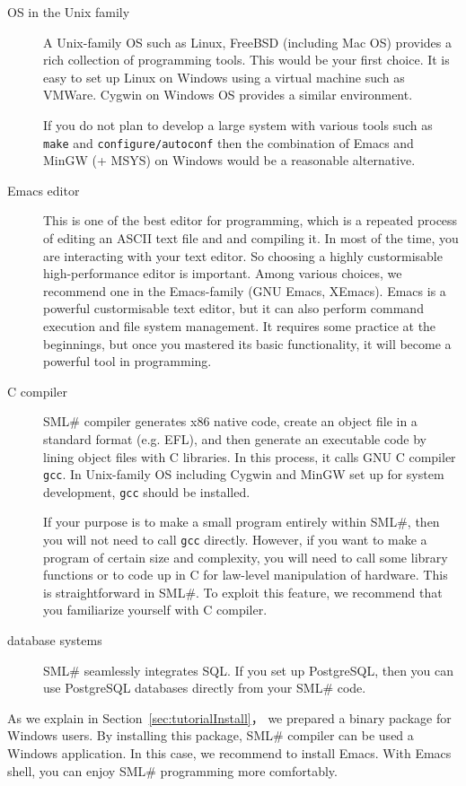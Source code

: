 \documentclass{jbook}
\newcommand{\smlsharp}{SML\#}
\begin{document}
\begin{description}
\item[OS in the Unix family] 
	A Unix-family OS such as Linux, FreeBSD (including Mac OS)
provides a rich collection of programming tools.
	This would be your first choice.
	It is easy to set up Linux on Windows using a virtual machine
such as VMWare.
	Cygwin on Windows OS provides a similar environment.

	If you do not plan to develop a large system with various tools
such as {\tt make} and {\tt configure/autoconf} then
the combination of Emacs and MinGW (+ MSYS) on Windows would be a
reasonable alternative.
	
\item[Emacs editor]
	This is one of the best editor for programming, which is a
repeated process of editing an ASCII text file and and compiling it.
	In most of the time, you are interacting with your text editor.
	So choosing a highly custormisable high-performance editor is
important.
	Among various choices, we recommend one in the Emacs-family (GNU
Emacs, XEmacs).
	Emacs is a powerful custormisable text editor, but it can also 
perform command execution and file system management. 
	It requires some practice at the beginnings, but once you mastered
its basic functionality, it will become a powerful tool in programming.

\item[C compiler] 
	\smlsharp{} compiler generates x86 native code, create an
object file in a standard format (e.g. EFL), and then generate 
an executable code by lining object files with C libraries.
	In this process, it calls GNU C compiler {\tt gcc}.
	In Unix-family OS including Cygwin and MinGW set up for
system development, {\tt gcc} should be installed.

	If your purpose is to make a small program entirely within
\smlsharp{}, then you will not need to call {\tt gcc} directly.
	However, if you want to make a program of certain size and
complexity, you will need to call some library functions or to code up
in C for law-level manipulation of hardware.
	This is straightforward in \smlsharp{}.
	To exploit this feature, we recommend that you familiarize
yourself with C compiler.	
\item[database systems] 
	\smlsharp{} seamlessly integrates SQL.
	If you set up PostgreSQL, then you can use PostgreSQL databases
directly from your \smlsharp{} code.
\end{description}

	As we explain in Section~\ref{sec:tutorialInstall}，
we prepared a binary package for Windows users.
	By installing this package, \smlsharp{} compiler can be used 
a Windows application.
	In this case, we recommend to install Emacs.
	With Emacs shell, you can enjoy \smlsharp{} programming more
comfortably.
\fi%
\end{document}
